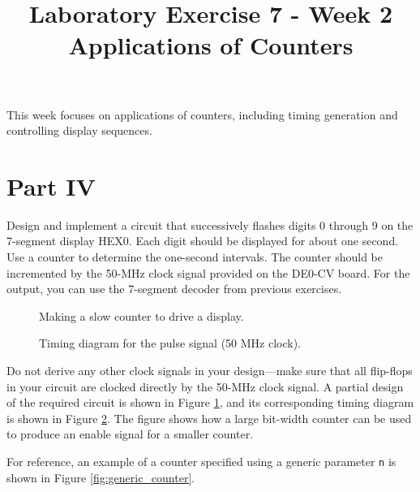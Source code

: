 \documentclass{article}
\title{Laboratory Exercise 7 - Week 2 \\ Applications of Counters}
\author{}
\date{}
\begin{document}
\maketitle

This week focuses on applications of counters, including timing generation and controlling display sequences.

\setcounter{figure}{3}

\section*{Part IV}

Design and implement a circuit that successively flashes digits 0 through 9 on the 7-segment display HEX0. Each digit should be displayed for about one second. Use a counter to determine the one-second intervals. The counter should be incremented by the 50-MHz clock signal provided on the DE0-CV board. For the output, you can use the 7-segment decoder from previous exercises.

\begin{figure}[H]
    \centering
    \resizebox{\textwidth}{!}{}
    \caption{Making a slow counter to drive a display.}
    \label{fig:slow_counter}
\end{figure}

\begin{figure}[H]
    \centering
    \resizebox{\textwidth}{!}{}
    \caption{Timing diagram for the pulse signal (50 MHz clock).}
    \label{fig:slow_counter_timing}
\end{figure}

Do not derive any other clock signals in your design—make sure that all flip-flops in your circuit are clocked directly by the 50-MHz clock signal. A partial design of the required circuit is shown in Figure \ref{fig:slow_counter}, and its corresponding timing diagram is shown in Figure \ref{fig:slow_counter_timing}. The figure shows how a large bit-width counter can be used to produce an enable signal for a smaller counter.

For reference, an example of a counter specified using a generic parameter \texttt{n} is shown in Figure \ref{fig:generic_counter}.
\end{document}
